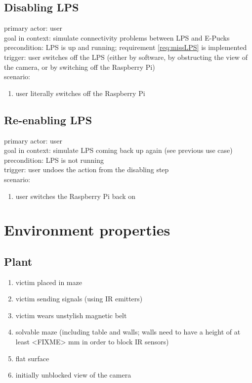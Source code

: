 \documentclass[a4paper,parskip,headheight=38pt]{scrartcl} %
\begin{document}
\subsection{Disabling LPS}
primary actor: user \\
goal in context: simulate connectivity problems between LPS and E-Pucks \\
precondition: LPS is up and running; requirement \ref{req:missLPS} is implemented \\
trigger: user switches off the LPS (either by software, by obstructing the view of the camera, or by switching off the Raspberry Pi) \\
scenario:
\begin{enumerate}[label={\arabic*.}]
	\item user literally switches off the Raspberry Pi
\end{enumerate}

\subsection{Re-enabling LPS}
primary actor: user \\
goal in context: simulate LPS coming back up again (see previous use case) \\
precondition: LPS is not running \\
trigger: user undoes the action from the disabling step \\
scenario:
\begin{enumerate}[label={\arabic*.}]
	\item user switches the Raspberry Pi back on
\end{enumerate}


\section{Environment properties}

\subsection{Plant}
\begin{enumerate}[label=\plant]
\item victim placed in maze
\item victim sending signals (using IR emitters)
\item victim wears unstylish magnetic belt
\item solvable maze (including table and walls; walls need to have a height of at least <FIXME> mm in order to block IR sensors)
\item flat surface
\item initially unblocked view of the camera
\end{enumerate}
\end{document}

